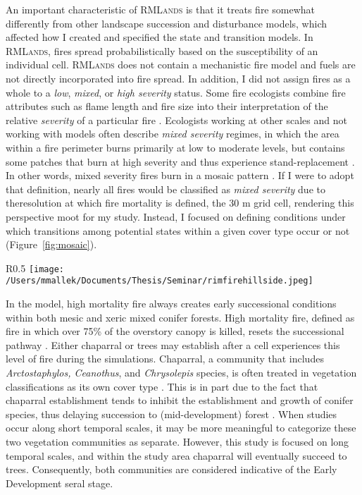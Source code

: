 An important characteristic of \textsc{RMLands} is that it treats fire somewhat differently from other landscape succession and disturbance models, which affected how I created and specified the state and transition models. In \textsc{RMLands}, fires spread probabilistically based on the susceptibility of an individual cell. \textsc{RMLands} does not contain a mechanistic fire model and fuels are not directly incorporated into fire spread. In addition, I did not assign fires as a whole to a \emph{low}, \emph{mixed}, or \emph{high severity} status. Some fire ecologists combine fire attributes such as flame length and fire size into their interpretation of the relative \emph{severity} of a particular fire \citep{Agee1993}. Ecologists working at other scales and not working with models often describe \emph{mixed severity} regimes, in which the area within a fire perimeter burns primarily at low to moderate levels, but contains some patches that burn at high severity and thus experience stand-replacement \citep{Collins2010,Kane2013}. In other words, mixed severity fires burn in a mosaic pattern \citep{Beaty2001}. If I were to adopt that definition, nearly all fires would be classified as \emph{mixed severity} due to theresolution at which fire mortality is defined, the 30 m grid cell, rendering this perspective moot for my study. Instead, I focused on defining conditions under which transitions among potential states within a given cover type occur or not (Figure~\ref{fig:mosaic}).

\begin{wrapfigure}{R}{0.5\textwidth} %
\texttt{[image: /Users/mmallek/Documents/Thesis/Seminar/rimfirehillside.jpeg]}
\caption{Aftermath of the 2013 Rim Fire in the Sierra Nevada. As in my model, post-fire, the landscape can be sorted into high mortality and low mortality areas. Photo from USFS Region 5.} 
\label{fig:mosaic}
\end{wrapfigure} 


In the model, high mortality fire always creates early successional conditions within both mesic and xeric mixed conifer forests. High mortality fire, defined as fire in which over 75\% of the overstory canopy is killed, resets the successional pathway \citep{Agee1993}. Either chaparral or trees may establish after a cell experiences this level of fire during the simulations. Chaparral, a community that includes \emph{Arctostaphylos, Ceanothus}, and \emph{Chrysolepis} species, is often treated in vegetation classifications as its own cover type \citep{USDAForestService2008,VandeWater2011}. This is in part due to the fact that chaparral establishment tends to inhibit the establishment and growth of conifer species, thus delaying succession to (mid-development) forest \citep{Landfire2007}. When studies occur along short temporal scales, it may be more meaningful to categorize these two vegetation communities as separate. However, this study is focused on long temporal scales, and within the study area chaparral will eventually succeed to trees. Consequently, both communities are considered indicative of the Early Development seral stage.

